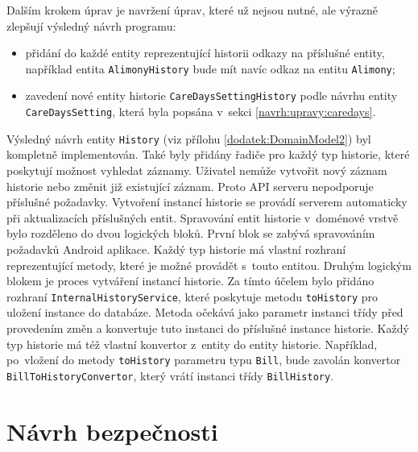         Dalším krokem úprav je navržení úprav, které už nejsou nutné, ale výrazně zlepšují výsledný návrh programu:
        \begin{itemize}
            \item přidání do každé entity reprezentující historii odkazy na příslušné entity, například entita \texttt{AlimonyHistory} bude mít navíc odkaz na entitu \texttt{Alimony};
            \item zavedení nové entity historie \texttt{CareDaysSettingHistory} podle návrhu entity \texttt{CareDaysSetting}, která byla popsána v~sekci \ref{navrh:upravy:caredays}.
        \end{itemize}
        Výsledný návrh entity \verb|History| (viz přílohu \ref{dodatek:DomainModel2}) byl kompletně implementován. Také byly přidány řadiče pro každý typ historie, které poskytují možnost vyhledat záznamy. Uživatel nemůže vytvořit nový záznam historie nebo změnit již existující záznam. Proto API serveru nepodporuje příslušné požadavky. Vytvoření instancí historie se provádí serverem automaticky při aktualizacích příslušných entit.
        Spravování entit historie v~doménové vrstvě bylo rozděleno do dvou logických bloků. První blok se zabývá spravováním požadavků Android aplikace. Každý typ historie má vlastní rozhraní reprezentující metody, které je možné provádět s~touto entitou. Druhým logickým blokem je proces vytváření instancí historie. Za tímto účelem bylo přidáno rozhraní \verb|InternalHistoryService|, které poskytuje metodu \verb|toHistory| pro uložení instance do databáze.
        Metoda očekává jako parametr instanci třídy před provedením změn a konvertuje tuto instanci do příslušné instance historie. Každý typ historie má též vlastní konvertor z~entity do entity historie. Například, po~vložení do metody \verb|toHistory| parametru typu \verb|Bill|, bude zavolán konvertor \verb|BillToHistoryConvertor|, který vrátí instanci třídy \verb|BillHistory|. 

\section{Návrh bezpečnosti}\label{navrh:bezpecnost}
